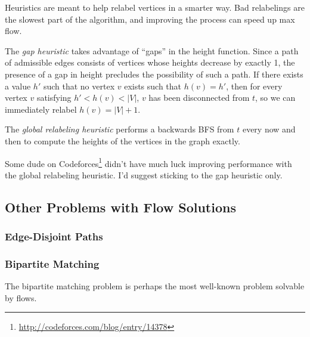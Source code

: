 Heuristics are meant to help relabel vertices in a smarter way. Bad relabelings are the slowest part of the algorithm, and improving the process can speed up max flow.

The \textit{gap heuristic} takes advantage of ``gaps'' in the height function. Since a path of admissible edges consists of vertices whose heights decrease by exactly 1, the presence of a gap in height precludes the possibility of such a path. If there exists a value $h'$ such that no vertex $v$ exists such that $h(v)=h'$, then for every vertex $v$ satisfying $h' < h(v) < |V|$, $v$ has been disconnected from $t$, so we can immediately relabel $h(v)=|V| + 1$.

The \textit{global relabeling heuristic} performs a backwards BFS from $t$ every now and then to compute the heights of the vertices in the graph exactly.

Some dude on Codeforces\footnote{\url{http://codeforces.com/blog/entry/14378}} didn't have much luck improving performance with the global relabeling heuristic. I'd suggest sticking to the gap heuristic only.

\subsection{Other Problems with Flow Solutions}

\subsubsection{Edge-Disjoint Paths}

\subsubsection{Bipartite Matching}

The bipartite matching problem is perhaps the most well-known problem solvable by flows.






